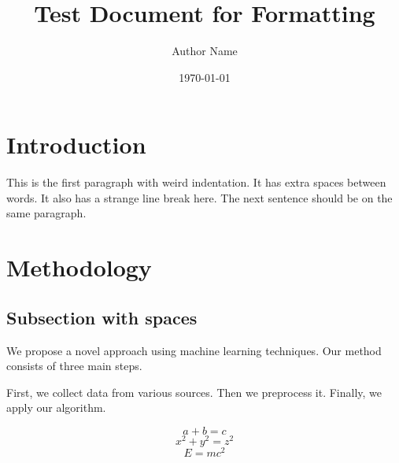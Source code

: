 \documentclass{article}
\title{Test Document for Formatting}
\author{Author Name}
\date{\today}
\begin{document}
\maketitle

\section{  Introduction  }

    This is the first paragraph with weird indentation.
    It has   extra spaces   between words.
     It also has a strange line break here.
The next sentence should be on the same paragraph.

  \section{Methodology}

\subsection{  Subsection  with   spaces  }

We propose a novel approach using machine learning techniques.
Our method consists of three main steps.

First, we collect data from various sources. Then we preprocess it.
Finally, we apply our algorithm.

\begin{equation}
a + b = c
\end{equation}
\begin{equation}
x ^ 2 + y ^ 2 = z ^ 2
\end{equation}
\begin{equation}
E = mc ^ 2
\end{equation}
\end{document}
